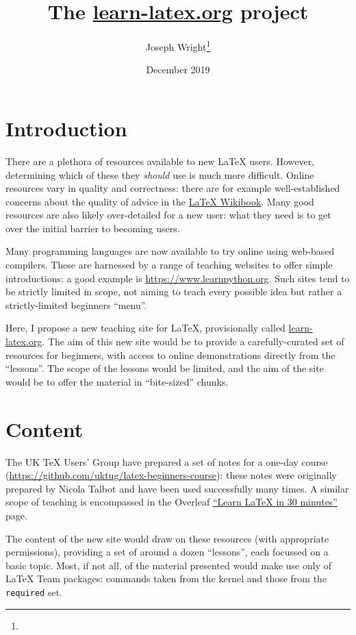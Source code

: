 \documentclass{article}
\author{Joseph Wright\thanks{\email{joseph.wright@morningstar2.co.uk}}}
\date{December 2019}
\title{The \url{learn-latex.org} project}
\begin{document}
\maketitle

\section{Introduction}

There are a plethora of resources available to new \LaTeX{} users. However,
determining which of these they \emph{should} use is much more difficult.
Online resources vary in quality and correctness: there are for example
well-established concerns about the quality of advice in the
\href{https://en.wikibooks.org/wiki/LaTeX}{\LaTeX{} Wikibook}. Many good
resources are also likely over-detailed for a new user: what they need is to
get over the initial barrier to becoming users.

Many programming languages are now available to try online using
web-based compilers. These are harnessed by a range of teaching websites to
offer simple introductions: a good example is \url{https://www.learnpython.org}.
Such sites tend to be strictly limited in scope, not aiming to teach every
possible idea but rather a strictly-limited beginners \enquote{menu}.

Here, I propose a new teaching site for \LaTeX{}, provisionally
called \url{learn-latex.org}. The aim of this new site would be to provide
a carefully-curated set of resources for beginners, with access to online
demonstrations directly from the \enquote{lessons}. The scope of the lessons
would be limited, and the aim of the site would be to offer the material
in \enquote{bite-sized} chunks.

\section{Content}

The UK \TeX{} Users' Group have prepared a set of notes for a one-day course
(\url{https://github.com/uktug/latex-beginners-course}): these notes were
originally prepared by Nicola Talbot and have been used successfully many
times. A similar scope of teaching is encompassed in the Overleaf
\href{https://www.overleaf.com/learn/latex/Learn_LaTeX_in_30_minutes}{\enquote{Learn
\LaTeX{} in 30 minutes}} page.

The content of the new site would draw on these resources (with appropriate
permissions), providing a set of around a dozen \enquote{lessons}, each
focussed on a basic topic. Most, if not all, of the material presented would
make use only of \LaTeX{} Team packages: commands taken from the kernel and
those from the \texttt{required} set.
\end{document}
